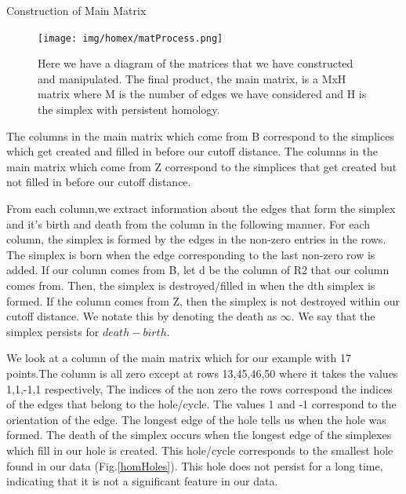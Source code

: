 \documentclass[12pt, a4paper, twocolumn, fullpage]{article}
\theoremstyle{plain}
\theoremstyle{definition}
\theoremstyle{remark}
\begin{document}
\begin{algorithm}
\caption{Construction of Main Matrix}
\begin{algorithmic}
    \ENDIF
    \ENDIF
\ENDFOR
\end{algorithmic}
\end{algorithm}

\begin{figure}
    \texttt{[image: img/homex/matProcess.png]}
    \caption{Here we have a diagram of the matrices that we have constructed and manipulated. The final product, the main matrix, is a MxH matrix where M is the number of edges we have considered and H is the simplex with persistent homology.}
    \label{MatricesOfComputeHom}
\end{figure}

The columns in the main matrix which come from B correspond to the simplices which get created and filled in before our cutoff distance. The columns in the main matrix which come from Z correspond to the simplices that get created but not filled in before our cutoff distance.

From each column,we extract information about the edges that form the simplex and it's birth and death from the column in the following manner. For each column, the simplex is formed by the edges in the non-zero entries in the rows. The simplex is born when the edge corresponding to the last non-zero row is added. If our column comes from B, let d be the column of R2 that our column comes from. Then, the simplex is destroyed/filled in when the dth simplex is formed. If the column comes from Z, then the simplex is not destroyed within our cutoff distance. We notate this by denoting the death as $\infty$. We say that the simplex persists for $death - birth$.

We look at a column of the main matrix which for our example with 17 points.The column is all zero except at rows 13,45,46,50 where it takes the values 1,1,-1,1 respectively, The indices of the non zero the rows correspond the indices of the edges that belong to the hole/cycle. The values 1 and -1 correspond to the orientation of the edge. The longest edge of the hole tells us when the hole was formed. The death of the simplex occurs when the longest edge of the simplexes which fill in our hole is created. This hole/cycle corresponds to the smallest hole found in our data (Fig.\ref{homHoles}). This hole does not persist for a long time, indicating that it is not a significant feature in our data.
\end{document}
